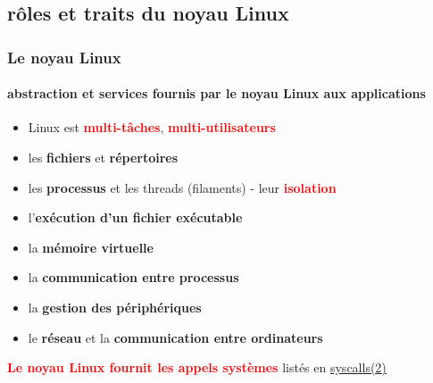 \documentclass[xcolor=svgnames,final,smaller,a4]{beamer}
\begin{document}
\subsection{rôles et traits du noyau Linux}
\begin{frame}
  \frametitle{Le noyau Linux}
  \framesubtitle{abstraction et services fournis par le noyau Linux aux applications}

  
  \begin{itemize}

  \item Linux est \textcolor{red}{\textbf{multi-tâches}}, \textcolor{red}{\textbf{multi-utilisateurs}}

  \item les \textbf{fichiers} et \textbf{répertoires}

  \item les \textbf{processus}  {} et les threads (filaments) - leur  \textcolor{red}{\textbf{isolation}}

  \item l'\textbf{exécution d'un fichier exécutable}

    \item la \textbf{mémoire virtuelle}
    
  \item la \textbf{communication entre processus}

  \item la \textbf{gestion des périphériques} {}

  \item le \textbf{réseau} {} et la \textbf{communication entre ordinateurs} {}

  \end{itemize}

   \textcolor{red}{\textbf{Le noyau Linux fournit les appels systèmes}} listés en \href{https://man7.org/linux/man-pages/man2/syscalls.2.html}{syscalls(2)}
\end{frame}
\end{document}
